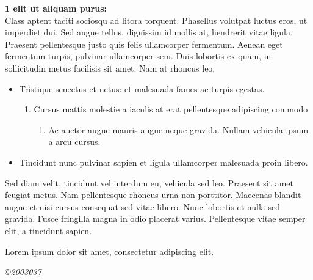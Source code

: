 \documentclass[a4paper, 10pt]{book}
\begin{document}
\noindent
\textbf{\Huge{1 \hspace{2mm} elit ut aliquam purus:}} \\[6mm]
Class aptent taciti sociosqu ad litora torquent.
Phasellus volutpat luctus eros, ut imperdiet dui.
Sed augue tellus, dignissim id mollis at, hendrerit vitae ligula.
Praesent pellentesque justo quis felis ullamcorper fermentum.
Aenean eget fermentum turpis, pulvinar ullamcorper sem.
Duis lobortis ex quam, in sollicitudin metus facilisis sit amet. Nam at rhoncus leo.
\begin{itemize}
    \item Tristique senectus et netus: et malesuada fames ac turpis egestas.
    \begin{enumerate}
        \item Cursus mattis molestie a iaculis at erat pellentesque adipiscing commodo
        \begin{enumerate}
            \item Ac auctor augue mauris augue neque gravida. Nullam vehicula ipsum a arcu cursus.
        \end{enumerate}
    \end{enumerate}
    \item Tincidunt nunc pulvinar sapien et ligula ullamcorper malesuada proin libero.
\end{itemize}

Sed diam velit, tincidunt vel interdum eu, vehicula sed leo.
Praesent sit amet feugiat metus. Nam pellentesque rhoncus urna non porttitor.
Maecenas blandit augue et nisi cursus consequat sed vitae libero.
Nunc lobortis et nulla sed gravida. Fusce fringilla magna in odio placerat varius.
Pellentesque vitae semper elit, a tincidunt sapien.
\begin{flushright}
    Lorem ipsum dolor sit amet, consectetur adipiscing elit.
\end{flushright}
\copyright \emph{2003037}
\end{document}
